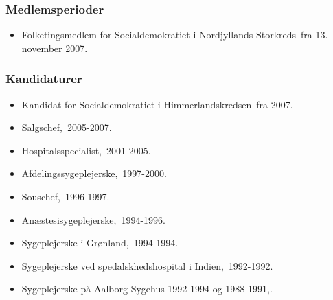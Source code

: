 \documentclass[11pt, a4paper]{awesome-cv}
\begin{document}
\begin{cvletter}
\subsubsection*{Medlemsperioder}
\begin{itemize}
\item Folketingsmedlem for Socialdemokratiet i Nordjyllands Storkreds fra 13. november 2007.
\end{itemize}
\subsubsection*{Kandidaturer}
\begin{itemize}
\item Kandidat for Socialdemokratiet i Himmerlandskredsen fra 2007.
\end{itemize}
\begin{itemize}
\item Salgschef, 2005-2007.
\item Hospitalsspecialist, 2001-2005.
\item Afdelingssygeplejerske, 1997-2000.
\item Souschef, 1996-1997.
\item Anæstesisygeplejerske, 1994-1996.
\item Sygeplejerske i Grønland, 1994-1994.
\item Sygeplejerske ved spedalskhedshospital i Indien, 1992-1992.
\item Sygeplejerske på Aalborg Sygehus 1992-1994 og 1988-1991,.
\end{itemize}
\end{cvletter}
\end{document}
